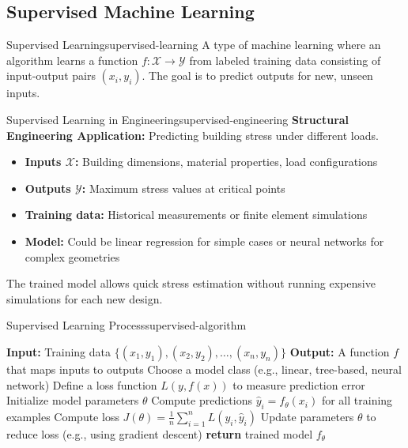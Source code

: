 \documentclass[12pt]{article}
\begin{document}
\subsection{Supervised Machine Learning} %

\begin{definition}{Supervised Learning}{supervised-learning}
A type of machine learning where an algorithm learns a function $f: \mathcal{X} \rightarrow \mathcal{Y}$ from labeled training data consisting of input-output pairs $(x_i, y_i)$. The goal is to predict outputs for new, unseen inputs.
\end{definition}

\begin{example}{Supervised Learning in Engineering}{supervised-engineering}
\textbf{Structural Engineering Application:} Predicting building stress under different loads.

\begin{itemize}
    \item \textbf{Inputs $\mathcal{X}$:} Building dimensions, material properties, load configurations
    \item \textbf{Outputs $\mathcal{Y}$:} Maximum stress values at critical points
    \item \textbf{Training data:} Historical measurements or finite element simulations
    \item \textbf{Model:} Could be linear regression for simple cases or neural networks for complex geometries
\end{itemize}

The trained model allows quick stress estimation without running expensive simulations for each new design.
\end{example}

\begin{algorithmenv}{Supervised Learning Process}{supervised-algorithm}
\begin{algorithmic}[1]
\State \textbf{Input:} Training data $\{(x_1, y_1), (x_2, y_2), \ldots, (x_n, y_n)\}$
\State \textbf{Output:} A function $f$ that maps inputs to outputs
\State Choose a model class (e.g., linear, tree-based, neural network)
\State Define a loss function $L(y, f(x))$ to measure prediction error
\State Initialize model parameters $\theta$
    \State Compute predictions $\hat{y}_i = f_\theta(x_i)$ for all training examples
    \State Compute loss $J(\theta) = \frac{1}{n}\sum_{i=1}^n L(y_i, \hat{y}_i)$
    \State Update parameters $\theta$ to reduce loss (e.g., using gradient descent)
\EndWhile
\State \textbf{return} trained model $f_\theta$
\end{algorithmic}
\end{algorithmenv}
\end{document}
